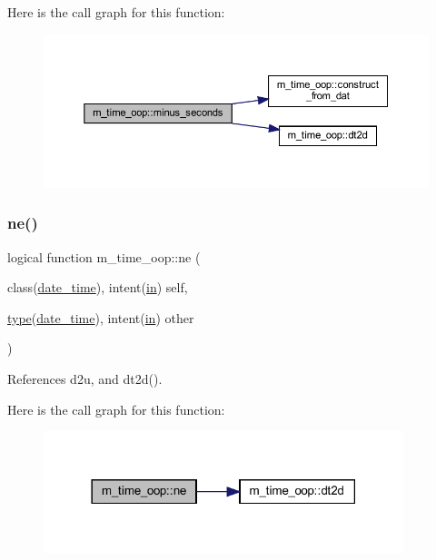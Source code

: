 Here is the call graph for this function\+:
\nopagebreak
\begin{figure}[H]
\begin{center}
\leavevmode
\includegraphics[width=350pt]{namespacem__time__oop_a395fbf19c6617641aea39c33fd4b2087_cgraph}
\end{center}
\end{figure}
\mbox{\label{namespacem__time__oop_a7707a7cbd4869301a613ceeb12ed2384}} 
\subsubsection{\texorpdfstring{ne()}{ne()}}
{\footnotesize\ttfamily logical function m\+\_\+time\+\_\+oop\+::ne (\begin{DoxyParamCaption}\item[{class(\hyperlink{structm__time__oop_1_1date__time}{date\+\_\+time}), intent(\hyperlink{M__journal_83_8txt_afce72651d1eed785a2132bee863b2f38}{in})}]{self,  }\item[{\hyperlink{stop__watch_83_8txt_a70f0ead91c32e25323c03265aa302c1c}{type}(\hyperlink{structm__time__oop_1_1date__time}{date\+\_\+time}), intent(\hyperlink{M__journal_83_8txt_afce72651d1eed785a2132bee863b2f38}{in})}]{other }\end{DoxyParamCaption})\hspace{0.3cm}{\ttfamily [private]}}



References d2u, and dt2d().

Here is the call graph for this function\+:
\nopagebreak
\begin{figure}[H]
\begin{center}
\leavevmode
\includegraphics[width=297pt]{namespacem__time__oop_a7707a7cbd4869301a613ceeb12ed2384_cgraph}
\end{center}
\end{figure}
\mbox{\label{namespacem__time__oop_a7845f6da505dff53007df45b5c198081}} 
